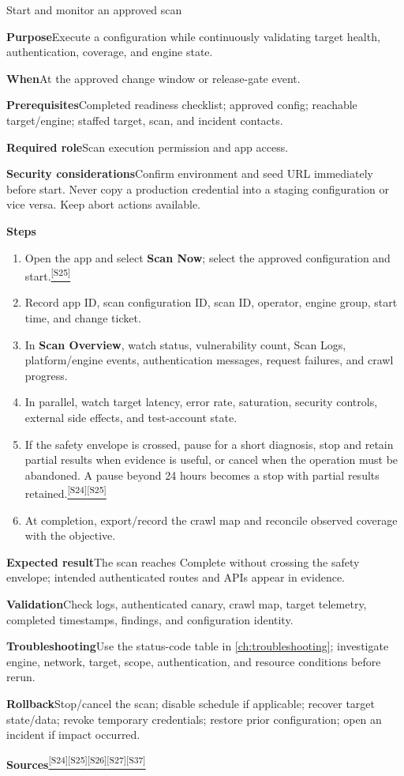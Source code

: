 \documentclass[11pt,letterpaper,oneside]{scrreprt}
\newcommand{\src}[1]{\hyperref[src:#1]{\textsuperscript{\color{R7Orange}[#1]}}}
\newcommand{\uipath}[1]{\textsf{\textbf{#1}}}
\newcommand{\field}[1]{\par\smallskip\noindent\textbf{#1}\quad}
\begin{document}
\begin{procedure}{Start and monitor an approved scan}
\field{Purpose}Execute a configuration while continuously validating target health, authentication, coverage, and engine state.
\field{When}At the approved change window or release-gate event.
\field{Prerequisites}Completed readiness checklist; approved config; reachable target/engine; staffed target, scan, and incident contacts.
\field{Required role}Scan execution permission and app access.
\field{Security considerations}Confirm environment and seed URL immediately before start. Never copy a production credential into a staging configuration or vice versa. Keep abort actions available.
\field{Steps}
\begin{enumerate}
  \item Open the app and select \uipath{Scan Now}; select the approved configuration and start.\src{S25}
  \item Record app ID, scan configuration ID, scan ID, operator, engine group, start time, and change ticket.
  \item In \uipath{Scan Overview}, watch status, vulnerability count, Scan Logs, platform/engine events, authentication messages, request failures, and crawl progress.
  \item In parallel, watch target latency, error rate, saturation, security controls, external side effects, and test-account state.
  \item If the safety envelope is crossed, pause for a short diagnosis, stop and retain partial results when evidence is useful, or cancel when the operation must be abandoned. A pause beyond 24 hours becomes a stop with partial results retained.\src{S24}\src{S25}
  \item At completion, export/record the crawl map and reconcile observed coverage with the objective.
\end{enumerate}
\field{Expected result}The scan reaches Complete without crossing the safety envelope; intended authenticated routes and APIs appear in evidence.
\field{Validation}Check logs, authenticated canary, crawl map, target telemetry, completed timestamps, findings, and configuration identity.
\field{Troubleshooting}Use the status-code table in \cref{ch:troubleshooting}; investigate engine, network, target, scope, authentication, and resource conditions before rerun.
\field{Rollback}Stop/cancel the scan; disable schedule if applicable; recover target state/data; revoke temporary credentials; restore prior configuration; open an incident if impact occurred.
\field{Sources}\src{S24}\src{S25}\src{S26}\src{S27}\src{S37}
\end{procedure}
\end{document}
